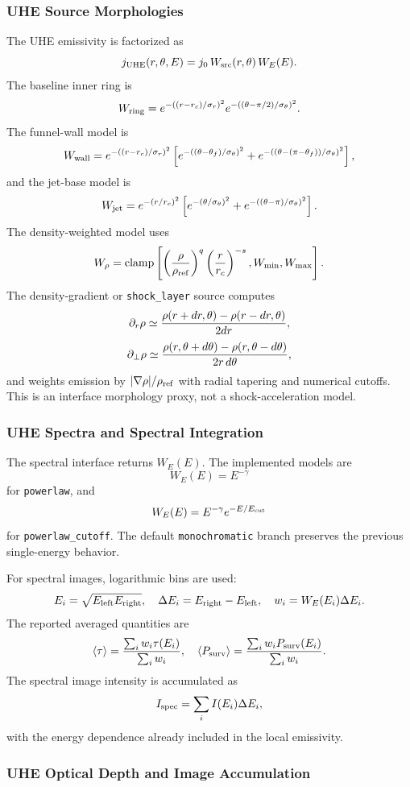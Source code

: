 \documentclass[11pt,a4paper]{article}
\begin{document}
\subsubsection{UHE Source Morphologies}

The UHE emissivity is factorized as
\[
j_{\rm UHE}(r,\theta,E)=j_0\,W_{\rm src}(r,\theta)\,W_E(E).
\]
The baseline inner ring is
\[
W_{\rm ring}=
e^{-((r-r_c)/\sigma_r)^2}
e^{-((\theta-\pi/2)/\sigma_\theta)^2}.
\]
The funnel-wall model is
\[
W_{\rm wall}=e^{-((r-r_c)/\sigma_r)^2}
\left[e^{-((\theta-\theta_f)/\sigma_\theta)^2}
     +e^{-((\theta-(\pi-\theta_f))/\sigma_\theta)^2}\right],
\]
and the jet-base model is
\[
W_{\rm jet}=e^{-(r/r_c)^2}
\left[e^{-(\theta/\sigma_\theta)^2}
     +e^{-((\theta-\pi)/\sigma_\theta)^2}\right].
\]
The density-weighted model uses
\[
W_\rho={\rm clamp}\left[
\left({\rho\over \rho_{\rm ref}}\right)^q
\left({r\over r_c}\right)^{-s},
W_{\min},W_{\max}\right].
\]
The density-gradient or \texttt{shock\_layer} source computes
\[
\partial_r\rho\simeq{\rho(r+dr,\theta)-\rho(r-dr,\theta)\over 2dr},
\]
\[
\partial_\perp\rho\simeq
{\rho(r,\theta+d\theta)-\rho(r,\theta-d\theta)\over 2r\,d\theta},
\]
and weights emission by
$|\nabla\rho|/\rho_{\rm ref}$ with radial tapering and numerical cutoffs. This
is an interface morphology proxy, not a shock-acceleration model.

\subsubsection{UHE Spectra and Spectral Integration}

The spectral interface returns $W_E(E)$. The implemented models are
\[
W_E(E)=E^{-\gamma}
\]
for \texttt{powerlaw}, and
\[
W_E(E)=E^{-\gamma}e^{-E/E_{\rm cut}}
\]
for \texttt{powerlaw\_cutoff}. The default \texttt{monochromatic} branch
preserves the previous single-energy behavior.

For spectral images, logarithmic bins are used:
\[
E_i=\sqrt{E_{\rm left}E_{\rm right}},\quad
\Delta E_i=E_{\rm right}-E_{\rm left},\quad
w_i=W_E(E_i)\Delta E_i.
\]
The reported averaged quantities are
\[
\langle\tau\rangle={\sum_i w_i\tau(E_i)\over \sum_i w_i},\quad
\langle P_{\rm surv}\rangle={\sum_i w_iP_{\rm surv}(E_i)\over \sum_i w_i}.
\]
The spectral image intensity is accumulated as
\[
I_{\rm spec}=\sum_i I(E_i)\Delta E_i,
\]
with the energy dependence already included in the local emissivity.

\subsubsection{UHE Optical Depth and Image Accumulation}
\end{document}
